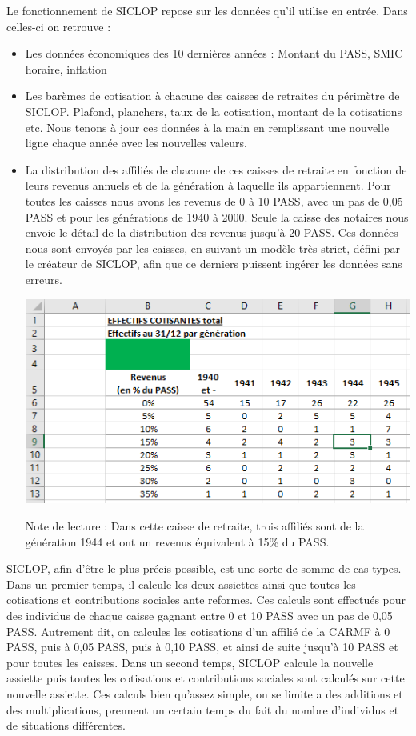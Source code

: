 Le fonctionnement de SICLOP repose sur les données qu'il utilise en entrée. Dans celles-ci on retrouve :
\begin{itemize}
    \item Les données économiques des 10 dernières années : Montant du PASS, SMIC horaire, inflation

    \item Les barèmes de cotisation à chacune des caisses de retraites du périmètre de SICLOP. Plafond, planchers, taux de la cotisation, montant de la cotisations etc. 
    Nous tenons à jour ces données à la main en remplissant une nouvelle ligne chaque année avec les nouvelles valeurs.

    \item La distribution des affiliés de chacune de ces caisses de retraite en fonction de leurs revenus annuels et de la génération à laquelle ils appartiennent. Pour toutes les caisses nous avons les revenus de 0 à 10 PASS, avec un pas de 0,05 PASS et pour les générations de 1940 à 2000. Seule la caisse des notaires nous envoie le détail de la distribution des revenus jusqu'à 20 PASS. Ces données nous sont envoyés par les caisses, en suivant un modèle très strict, défini par le créateur de SICLOP, afin que ce derniers puissent ingérer les données sans erreurs.
    	\begin{center}
			\includegraphics{figures/chap2/inputSICLOP.png}
		\end{center}
\vspace{-0.5cm}

    Note de lecture : Dans cette caisse de retraite, trois affiliés sont de la génération 1944 et ont un revenus équivalent à 15\% du PASS.
\end{itemize}

SICLOP, afin d'être le plus précis possible, est une sorte de somme de cas types. Dans un premier temps, il calcule les deux assiettes ainsi que toutes les cotisations et contributions sociales ante reformes. Ces calculs sont effectués pour des individus de chaque caisse gagnant entre 0 et 10 PASS avec un pas de 0,05 PASS.
Autrement dit, on calcules les cotisations d'un affilié de la CARMF à 0 PASS, puis à 0,05 PASS, puis à 0,10 PASS, et ainsi de suite jusqu'à 10 PASS et pour toutes les caisses.
Dans un second temps, SICLOP calcule la nouvelle assiette puis toutes les cotisations et contributions sociales sont calculés sur cette nouvelle assiette. 
Ces calculs bien qu'assez simple, on se limite a des additions et des multiplications, prennent un certain temps du fait du nombre d'individus et de situations différentes. 

